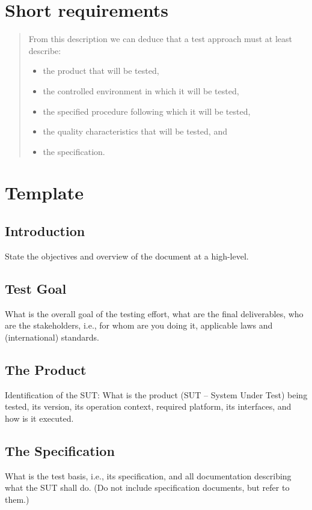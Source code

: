 \documentclass[11pt,a4paper]{article}
\begin{document}
\section{Short requirements}
\label{sec:orgheadline10}
\begin{quote}
From this description we can deduce that a test approach must at least describe:
\begin{itemize}
\item the product that will be tested,
\item the controlled environment in which it will be tested,
\item the specified procedure following which it will be tested,
\item the quality characteristics that will be tested, and
\item the specification.
\end{itemize}
\end{quote}

\section{Template}
\label{sec:orgheadline25}
\subsection{Introduction}
\label{sec:orgheadline11}
State the objectives and overview of the document at a high-level.
\subsection{Test Goal}
\label{sec:orgheadline12}
What is the overall goal of the testing effort, what are the final deliverables, who are the
stakeholders, i.e., for whom are you doing it, applicable laws and (international) standards.
\subsection{The Product}
\label{sec:orgheadline13}
Identification of the SUT: What is the product (SUT – System Under Test) being tested, its
version, its operation context, required platform, its interfaces, and how is it executed.
\subsection{The Specification}
\label{sec:orgheadline14}
What is the test basis, i.e., its specification, and all documentation describing what the SUT
shall do. (Do not include specification documents, but refer to them.)
\end{document}
